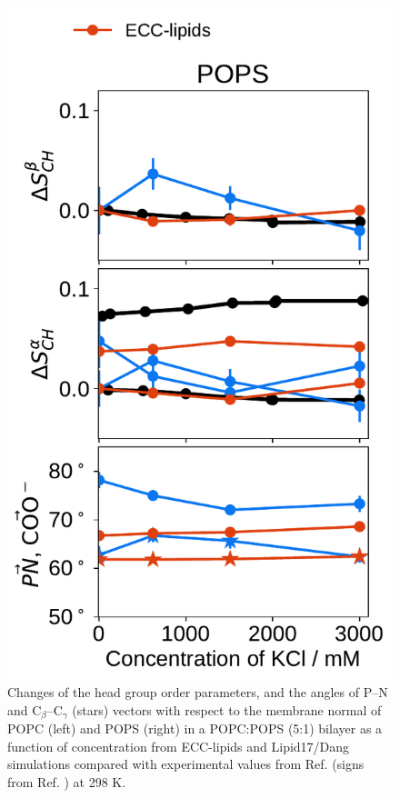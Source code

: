 \documentclass[journal=jpcbfk,manuscript=article]{achemso}
\newlength{\figheight}
\begin{document}
\begin{figure}[tbp!]
  \includegraphics[height=\figheight]{../img/ecc_pops/order_parameters_changes_ecc-lip_L14_A-B-PN-COO_POPS_kcl.pdf} 
  \caption{\label{fig:delta_ordPar_KCl_PCPS}
    Changes of the head group order parameters, and the angles of P--N and C$_\beta$--C$_\gamma$ (stars) vectors 
    with respect to the membrane normal of POPC (left) and POPS (right) in a POPC:POPS (5:1) bilayer 
    as a function of  concentration from ECC-lipids and Lipid17/Dang simulations 
    compared with experimental values from Ref.  (signs from Ref. ) at 298 K.
  }
\end{figure} 
 
\end{document}
